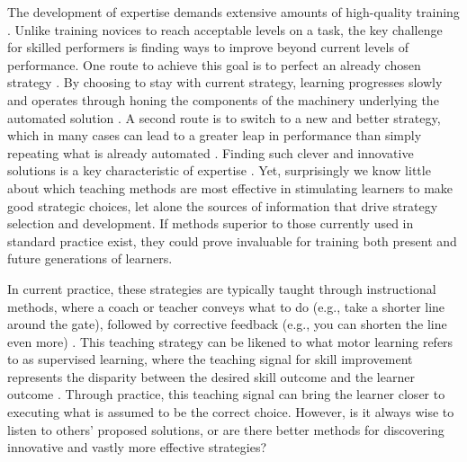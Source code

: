 \documentclass[pdflatex,sn-mathphys-num]{sn-jnl}%
\theoremstyle{thmstyleone}%
\theoremstyle{thmstyletwo}%
\theoremstyle{thmstylethree}%
\begin{document}
The development of expertise demands extensive amounts of high-quality training \cite{ericsson_role_1993, hodges_predicting_2004, vaeyens_talent_2009, sosniak_learning_1985}. Unlike training novices to reach acceptable levels on a task, the key challenge for skilled performers is finding ways to improve beyond current levels of performance\cite{ericsson_development_2003, ericsson_scientific_1998, gray_plateaus_2017, williams_expertise_2008, du_relationship_2022}. One route to achieve this goal is to perfect an already chosen strategy \cite{krakauer_motor_2019, du_relationship_2022}. By choosing to stay with current strategy, learning progresses slowly and operates through honing the components of the machinery underlying the automated solution \cite{du_relationship_2022}. A second route is to switch to a new and better strategy, which in many cases can lead to a greater leap in performance than simply repeating what is already automated  \cite{gray_plateaus_2017, du_relationship_2022, krakauer_motor_2019}. Finding such clever and innovative solutions is a key characteristic of expertise \cite{ericsson_scientific_1998, ericsson_development_2003}. Yet, surprisingly we know little about which teaching methods are most effective in stimulating learners to make good strategic choices, let alone the sources of information that drive strategy selection and development\cite{taylor_cerebellar_2014, taylor_role_2012}. If methods superior to those currently used in standard practice exist, they could prove invaluable for training both present and future generations of learners.

In current practice, these strategies are typically taught through instructional methods, where a coach or teacher conveys what to do (e.g., take a shorter line around the gate), followed by corrective feedback (e.g., you can shorten the line even more) \cite{williams_practice_2005, williams_effective_2023, hodges_role_1999}. This teaching strategy can be likened to what motor learning refers to as supervised learning, where the teaching signal for skill improvement represents the disparity between the desired skill outcome and the learner outcome \cite{jordan_forward_1992, wolpert_motor_2010, doya_complementary_2000}. Through practice, this teaching signal can bring the learner closer to executing what is assumed to be the correct choice. However, is it always wise to listen to others' proposed solutions, or are there better methods for discovering innovative and vastly more effective strategies?
\end{document}
